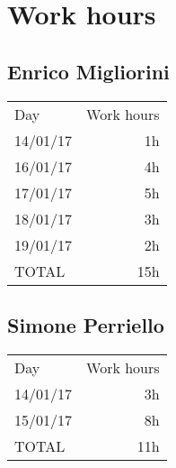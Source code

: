 \section{Work hours}
\subsection{Enrico Migliorini}
\begin{tabular}{l r}
	Day & Work hours \\
	14/01/17 & 1h \\
	16/01/17 & 4h \\
	17/01/17 & 5h \\
	18/01/17 & 3h \\
	19/01/17 & 2h \\ \hline
	TOTAL & 15h
\end{tabular}

\subsection{Simone Perriello}
\begin{tabular}{l r}
	Day & Work hours \\
	14/01/17 & 3h \\
	15/01/17 & 8h \\ \hline
	TOTAL & 11h \\
\end{tabular}